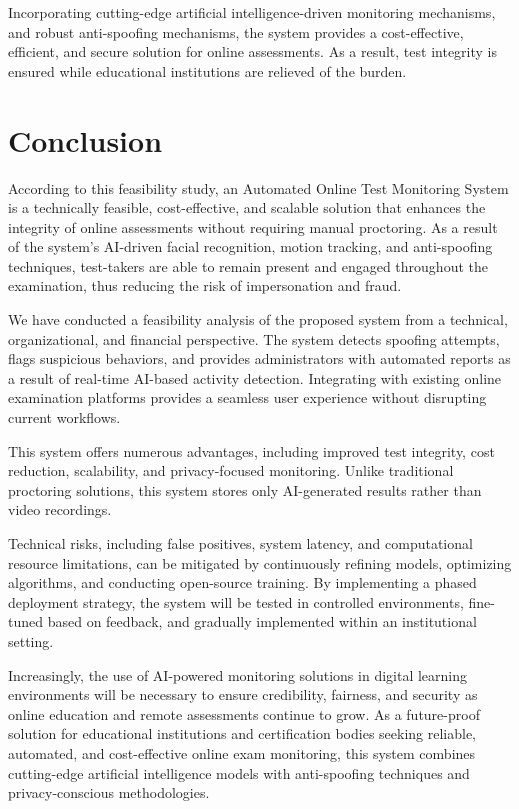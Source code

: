 \documentclass[12pt,a4paper]{article}
\begin{document}
Incorporating cutting-edge artificial intelligence-driven monitoring mechanisms, and robust anti-spoofing mechanisms, the system provides a cost-effective, efficient, and secure solution for online assessments. As a result, test integrity is ensured while educational institutions are relieved of the burden.


\section{Conclusion}
According to this feasibility study, an Automated Online Test Monitoring System is a technically feasible, cost-effective, and scalable solution that enhances the integrity of online assessments without requiring manual proctoring. As a result of the system's AI-driven facial recognition, motion tracking, and anti-spoofing techniques, test-takers are able to remain present and engaged throughout the examination, thus reducing the risk of impersonation and fraud.

We have conducted a feasibility analysis of the proposed system from a technical, organizational, and financial perspective. The system detects spoofing attempts, flags suspicious behaviors, and provides administrators with automated reports as a result of real-time AI-based activity detection. Integrating with existing online examination platforms provides a seamless user experience without disrupting current workflows. 

This system offers numerous advantages, including improved test integrity, cost reduction, scalability, and privacy-focused monitoring. Unlike traditional proctoring solutions, this system stores only AI-generated results rather than video recordings.

Technical risks, including false positives, system latency, and computational resource limitations, can be mitigated by continuously refining models, optimizing algorithms, and conducting open-source training. By implementing a phased deployment strategy, the system will be tested in controlled environments, fine-tuned based on feedback, and gradually implemented within an institutional setting.

Increasingly, the use of AI-powered monitoring solutions in digital learning environments will be necessary to ensure credibility, fairness, and security as online education and remote assessments continue to grow. As a future-proof solution for educational institutions and certification bodies seeking reliable, automated, and cost-effective online exam monitoring, this system combines cutting-edge artificial intelligence models with anti-spoofing techniques and privacy-conscious methodologies.
\end{document}
